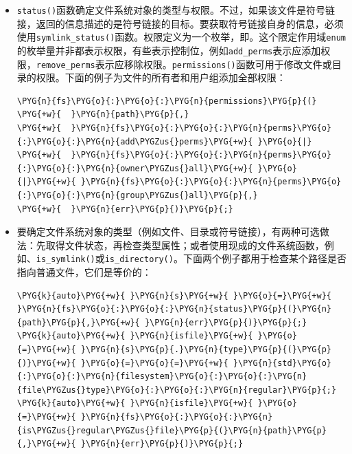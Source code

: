 \begin{itemize}

\item \texttt{status()}函数确定文件系统对象的类型与权限。不过，如果该文件是符号链接，返回的信息描述的是符号链接的目标。要获取符号链接自身的信息，必须使用\texttt{symlink\_\allowbreak{}status()}函数。权限定义为一个枚举，即。这个限定作用域\texttt{enum}的枚举量并非都表示权限，有些表示控制位，例如\texttt{add\_\allowbreak{}perms}表示应添加权限，\texttt{remove\_\allowbreak{}perms}表示应移除权限。\texttt{permissions()}函数可用于修改文件或目录的权限。下面的例子为文件的所有者和用户组添加全部权限：



\begin{codeblockbg}
\begin{Verbatim}[commandchars=\\\{\},breaklines=true,breakanywhere=true,fontsize=\codefont,xleftmargin=17bp]
\PYG{n}{fs}\PYG{o}{:}\PYG{o}{:}\PYG{n}{permissions}\PYG{p}{(}
\PYG{+w}{  }\PYG{n}{path}\PYG{p}{,}
\PYG{+w}{  }\PYG{n}{fs}\PYG{o}{:}\PYG{o}{:}\PYG{n}{perms}\PYG{o}{:}\PYG{o}{:}\PYG{n}{add\PYGZus{}perms}\PYG{+w}{ }\PYG{o}{|}
\PYG{+w}{  }\PYG{n}{fs}\PYG{o}{:}\PYG{o}{:}\PYG{n}{perms}\PYG{o}{:}\PYG{o}{:}\PYG{n}{owner\PYGZus{}all}\PYG{+w}{ }\PYG{o}{|}\PYG{+w}{ }\PYG{n}{fs}\PYG{o}{:}\PYG{o}{:}\PYG{n}{perms}\PYG{o}{:}\PYG{o}{:}\PYG{n}{group\PYGZus{}all}\PYG{p}{,}
\PYG{+w}{  }\PYG{n}{err}\PYG{p}{)}\PYG{p}{;}
\end{Verbatim}
\end{codeblockbg}



\item 要确定文件系统对象的类型（例如文件、目录或符号链接），有两种可选做法：先取得文件状态，再检查类型属性；或者使用现成的文件系统函数，例如、\texttt{is\_\allowbreak{}symlink()}或\texttt{is\_\allowbreak{}directory()}。下面两个例子都用于检查某个路径是否指向普通文件，它们是等价的：



\begin{codeblockbg}
\begin{Verbatim}[commandchars=\\\{\},breaklines=true,breakanywhere=true,fontsize=\codefont,xleftmargin=17bp]
\PYG{k}{auto}\PYG{+w}{ }\PYG{n}{s}\PYG{+w}{ }\PYG{o}{=}\PYG{+w}{ }\PYG{n}{fs}\PYG{o}{:}\PYG{o}{:}\PYG{n}{status}\PYG{p}{(}\PYG{n}{path}\PYG{p}{,}\PYG{+w}{ }\PYG{n}{err}\PYG{p}{)}\PYG{p}{;}
\PYG{k}{auto}\PYG{+w}{ }\PYG{n}{isfile}\PYG{+w}{ }\PYG{o}{=}\PYG{+w}{ }\PYG{n}{s}\PYG{p}{.}\PYG{n}{type}\PYG{p}{(}\PYG{p}{)}\PYG{+w}{ }\PYG{o}{=}\PYG{o}{=}\PYG{+w}{ }\PYG{n}{std}\PYG{o}{:}\PYG{o}{:}\PYG{n}{filesystem}\PYG{o}{:}\PYG{o}{:}\PYG{n}{file\PYGZus{}type}\PYG{o}{:}\PYG{o}{:}\PYG{n}{regular}\PYG{p}{;}
\PYG{k}{auto}\PYG{+w}{ }\PYG{n}{isfile}\PYG{+w}{ }\PYG{o}{=}\PYG{+w}{ }\PYG{n}{fs}\PYG{o}{:}\PYG{o}{:}\PYG{n}{is\PYGZus{}regular\PYGZus{}file}\PYG{p}{(}\PYG{n}{path}\PYG{p}{,}\PYG{+w}{ }\PYG{n}{err}\PYG{p}{)}\PYG{p}{;}
\end{Verbatim}
\end{codeblockbg}


\end{itemize}
